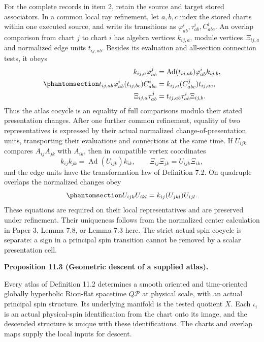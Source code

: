 \documentclass[
  english,
  11pt,
  reqno]{amsart}
\makeatletter
\newcommand{\pandocstatementheading}[1]{%
  \par\if@nobreak\else
    \addpenalty{\@beginparpenalty}%
    \addvspace{.5\baselineskip plus .2\baselineskip minus .2\baselineskip}%
  \fi
  {\normalfont\bfseries #1\par}%
  \nobreak\@afterindenttrue\@afterheading
}
\makeatother
\begin{document}
For the complete records in item 2, retain the source and target stored
associators. In a common local ray refinement, let \(a,b,c\) index the
stored charts within one executed source, and write its transitions as
\(\varphi^i_{ab},\tau^i_{ab},C^i_{abc}\). An overlap comparison from
chart \(j\) to chart \(i\) has algebra vertices \(k_{ij,a}\), module
vertices \(\Xi_{ij,a}\) and normalized edge units \(t_{ij,ab}\). Besides
its evaluation and all-section connection tests, it obeys
\begin{equation}\protect\phantomsection\label{eq:ordinary-atlas-full-overlap-equations}{
\begin{aligned}
k_{ij,a}\varphi^j_{ab}
 &=\operatorname{Ad}(t_{ij,ab})\varphi^i_{ab}k_{ij,b},\\
t_{ij,ab}\varphi^i_{ab}(t_{ij,bc})C^i_{abc}
 &=k_{ij,a}(C^j_{abc})t_{ij,ac},\\
\Xi_{ij,a}\tau^j_{ab}
 &=t_{ij,ab}\tau^i_{ab}\Xi_{ij,b}.
\end{aligned}
}\end{equation} Thus the atlas cocycle is an equality of full
comparisons modulo their stated presentation changes. After one further
common refinement, equality of two representatives is expressed by their
actual normalized change-of-presentation units, transporting their
evaluations and connections at the same time. If \(U_{ijk}\) compares
\(A_{ij}A_{jk}\) with \(A_{ik}\), then in compatible vertex coordinates
\[
k_{ij}k_{jk}=\operatorname{Ad}(U_{ijk})k_{ik},
\qquad
\Xi_{ij}\Xi_{jk}=U_{ijk}\Xi_{ik},
\] and the edge units have the transformation law of Definition 7.2. On
quadruple overlaps the normalized changes obey
\begin{equation}\protect\phantomsection\label{eq:ordinary-atlas-presentation-coherence}{
U_{ijk}U_{ikl}=k_{ij}(U_{jkl})U_{ijl}.
}\end{equation} These equations are required on their local
representatives and are preserved under refinement. Their uniqueness
follows from the normalized center calculation in Paper 3, Lemma 7.8, or
Lemma 7.3 here. The strict actual spin cocycle is separate: a sign in a
principal spin transition cannot be removed by a scalar presentation
cell.

\pandocstatementheading{\protect{}\label{prop:ordinary-atlas-geometric-descent}Proposition 11.3 (Geometric descent of a supplied atlas).}

Every atlas of Definition 11.2 determines a smooth oriented and
time-oriented globally hyperbolic Ricci-flat spacetime \(Q\mathcal P\)
at physical scale, with an actual principal spin structure. Its
underlying manifold is the tested quotient \(X\). Each \(\iota_i\) is an
actual physical-spin identification from the chart onto its image, and
the descended structure is unique with these identifications. The charts
and overlap maps supply the local inputs for descent.
\end{document}

